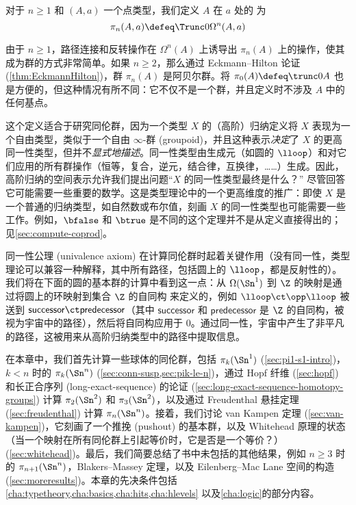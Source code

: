 \begin{defn}\label{def-of-homotopy-groups}
对于 $n\ge 1$ 和 $(A,a)$ 一个点类型，我们定义 $A$ 在 $a$ 处的
%
为
\[\pi_n(A,a)\defeq \Trunc0{\Omega^n(A,a)}\]
\end{defn}

\noindent
由于 $n\ge 1$，路径连接和反转操作在 $\Omega^n(A)$ 上诱导出 $\pi_n(A)$ 上的操作，使其成为群的方式非常简单。如果 $n\ge 2$，那么通过 Eckmann--Hilton 论证 (\cref{thm:EckmannHilton})，群 $\pi_n(A)$ 是阿贝尔群。将 $\pi_0(A) \defeq \trunc0 A$ 也是方便的，但这种情况有所不同：它不仅不是一个群，并且定义时不涉及 $A$ 中的任何基点。

%
这个定义适合于研究同伦群，因为一个类型 $X$ 的（高阶）归纳定义将 $X$ 表现为一个自由类型，类似于一个自由 $\infty$-群 (groupoid)，并且这种表示\emph{决定}了 $X$ 的更高同一性类型，但并不\emph{显式地描述}。同一性类型由生成元（如圆的 $\lloop$）和对它们应用的所有群操作（恒等，复合，逆元，结合律，互换律，……）生成。因此，高阶归纳的空间表示允许我们提出问题“$X$ 的同一性类型最终是什么？” 尽管回答它可能需要一些重要的数学。这是类型理论中的一个更高维度的推广：即使 $X$ 是一个普通的归纳类型，如自然数或布尔值，刻画 $X$ 的同一性类型也可能需要一些工作。例如，$\bfalse$ 和 $\btrue$ 是不同的这个定理并不是从定义直接得出的；见\cref{sec:compute-coprod}。

%
同一性公理 (univalence axiom) 在计算同伦群时起着关键作用（没有同一性，类型理论可以兼容一种解释，其中所有路径，包括圆上的 $\lloop$，都是反射性的）。我们将在下面的圆的基本群的计算中看到这一点：从 $\Omega(\Sn^1)$ 到 $\Z$ 的映射是通过将圆上的环映射到集合 $\Z$ 的自同构 来定义的，例如 $\lloop \ct \opp \lloop$ 被送到 $\mathsf{successor} \ct \mathsf{predecessor}$（其中 $\mathsf{successor}$ 和 $\mathsf{predecessor}$ 是 $\Z$ 的自同构，被视为宇宙中的路径），然后将自同构应用于 0。通过同一性，宇宙中产生了非平凡的路径，这被用来从高阶归纳类型中的路径中提取信息。

在本章中，我们首先计算一些球体的同伦群，包括 $\pi_k(\Sn ^1)$ (\cref{sec:pi1-s1-intro})，$k<n$ 时的 $\pi_{k}(\Sn ^n)$ (\cref{sec:conn-susp,sec:pik-le-n})，通过 Hopf 纤维 (\cref{sec:hopf}) 和长正合序列 (long-exact-sequence) 的论证 (\cref{sec:long-exact-sequence-homotopy-groups}) 计算 $\pi_2(\Sn ^2)$ 和 $\pi_3(\Sn ^2)$，以及通过 Freudenthal 悬挂定理 (\cref{sec:freudenthal}) 计算 $\pi_n(\Sn ^n)$。接着，我们讨论 van Kampen 定理 (\cref{sec:van-kampen})，它刻画了一个推挽 (pushout) 的基本群，以及 Whitehead 原理的状态（当一个映射在所有同伦群上引起等价时，它是否是一个等价？）(\cref{sec:whitehead})。最后，我们简要总结了书中未包括的其他结果，例如 $n\ge 3$ 时的 $\pi_{n+1}(\Sn ^n)$，Blakers--Massey 定理，以及 Eilenberg--Mac Lane 空间的构造 (\cref{sec:moreresults})。本章的先决条件包括\cref{cha:typetheory,cha:basics,cha:hits,cha:hlevels} 以及\cref{cha:logic}的部分内容。

